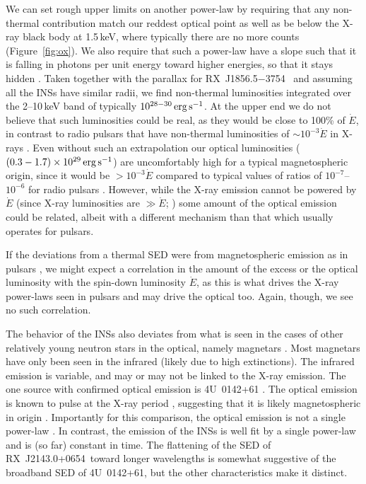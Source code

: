 \documentclass[iop]{emulateapj}
\newcommand{\expnt}[2]{\ensuremath{#1 \times 10^{#2}}}   %
\newcommand{\rxjw}{RX~J1856.5$-$3754}
\newcommand{\rbsb}{RX~J2143.0+0654}
\begin{document}
We can set rough upper limits on another power-law by requiring that
any non-thermal contribution match our reddest optical point as well
as be below the X-ray black body at 1.5\,keV, where typically there
are no more counts (Figure~\ref{fig:ox}).  We also require that such a
power-law have a slope such that it is falling in photons per unit
energy toward higher energies, so that it stays hidden
\citep[see][]{kvkm+03}.  Taken together with the parallax for
\rxjw\ \citep{wel+10} and assuming all the INSs have similar radii, we
find non-thermal luminosities integrated over the 2--10\,keV band of
typically $10^{28-30}\,{\rm erg\,s}^{-1}$.  At the upper end we do not
believe that such luminosities could be real, as they would be close
to 100\% of $\dot E$, in contrast to radio pulsars that have
non-thermal luminosities of $\sim 10^{-3} \dot E$ in X-rays
\citep{bt97}.  Even without such an extrapolation our optical
luminosities ($\expnt{(0.3-1.7)}{29}\,{\rm erg\,s}^{-1}$) are
uncomfortably high for a typical magnetospheric origin, since it would
be $>10^{-3}\dot E$ compared to typical values of ratios of
$10^{-7}$--$10^{-6}$ for radio pulsars \citep{zp04}.  However, while
the X-ray emission cannot be powered by $\dot E$ (since X-ray
luminosities are $\gg \dot E$; \citealt{kvk09b}) some amount of the
optical emission could be related, albeit with a different mechanism
than that which usually operates for pulsars.



If the deviations from a thermal SED were from magnetospheric emission
as in pulsars \citep{pwc97,ssl+05,kpzr05}, we might expect a
correlation in the amount of the excess or the optical luminosity with
the spin-down luminosity $\dot E$, as this is what drives the X-ray
power-laws seen in pulsars and may drive the optical too.  Again,
though, we see no such correlation.

The behavior of the INSs also deviates from what is seen in the cases
of other relatively young neutron stars in the optical, namely
magnetars \citep{mereghetti08}. Most magnetars have only been seen in
the infrared (likely due to high extinctions).  The infrared emission
is variable, and may or may not be linked to the X-ray emission.  The
one source with confirmed optical emission is 4U~0142+61
\citep*{hvkk00,hvkk04}.  The optical emission is known to pulse at the
X-ray period \citep{km02,dmh+05}, suggesting that it is likely
magnetospheric in origin \citep*{znt11}.  Importantly for this
comparison, the optical emission is not a single power-law
\citep{hvkk04}.  In contrast, the emission of the INSs is well fit by
a single power-law and is (so far) constant in time.  The flattening
of the SED of \rbsb\ toward longer wavelengths is somewhat suggestive
of the broadband SED of 4U~0142+61, but the other characteristics make
it distinct. 
\end{document}
